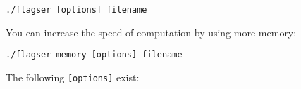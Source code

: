 \documentclass{amsart}
\theoremstyle{definition}
\begin{document}
\vspace{1em}

\begin{verbatim}./flagser [options] filename\end{verbatim}

\vspace{1em}

You can increase the speed of computation by using more memory:

\vspace{1em}

\begin{verbatim}./flagser-memory [options] filename\end{verbatim}

\vspace{1em}

\noindent
The following \texttt{[options]} exist:
\end{document}
